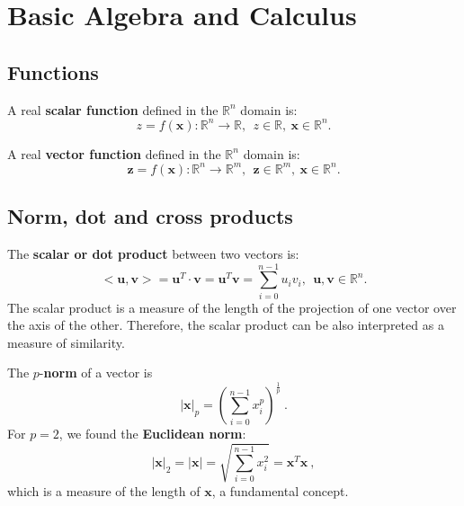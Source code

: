 
\section{Basic Algebra and Calculus}

\subsection{Functions}

A real \textbf{scalar function} defined in the $\mathbb{R}^n$ domain is:
\begin{equation}
 z=f(\mathbf{x}):\mathbb{R}^n \rightarrow \mathbb{R}, 
 \ \ z \in \mathbb{R}, \ \mathbf{x} \in \mathbb{R}^n.
\end{equation}

A real \textbf{vector function} defined in the $\mathbb{R}^n$ domain is:
\begin{equation}
 \mathbf{z}=f(\mathbf{x}):\mathbb{R}^n \rightarrow \mathbb{R}^m, 
 \ \ \mathbf{z} \in \mathbb{R}^m, \ \mathbf{x} \in \mathbb{R}^n.
\end{equation}

\subsection{Norm, dot and cross products }
\label{subsec:norm_dot_cross}

The \textbf{scalar or dot product} between two vectors is:
\begin{equation}
<\mathbf{u},\mathbf{v}> = \mathbf{u}^T \cdot \mathbf{v} = \mathbf{u}^T \mathbf{v} = \sum_{i=0}^{n-1} u_{i} v_{i}
, \ \ \mathbf{u},\mathbf{v} \in \mathbb{R}^n.
\end{equation}
The scalar product is a measure of the length of the projection of one vector over the axis of the other. 
Therefore, the scalar product can be also interpreted as a measure of similarity.

The $p$-\textbf{norm} of a vector is 
\begin{equation}
 \vert \mathbf{x} \vert _p = ( \sum_{i=0}^{n-1} x_{i}^p )^{\frac{1}{p}} \ .
\end{equation}
For $p = 2$, we found the \textbf{Euclidean norm}:
\begin{equation}
 \vert \mathbf{x} \vert _2 = \vert \mathbf{x} \vert = \sqrt{\sum_{i=0}^{n-1} x_{i}^2} = \mathbf{x}^T \mathbf{x}\ ,
\end{equation}
which is a measure of the length of $\mathbf{x}$, a fundamental concept.

